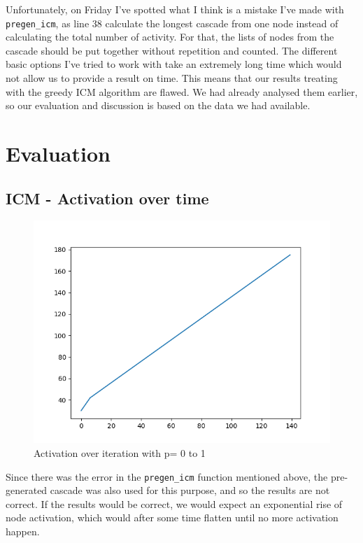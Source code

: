 Unfortunately, on Friday I've spotted what I think is a mistake I've made with \texttt{pregen\_icm}, as line 38 calculate the longest cascade from one node instead of calculating the total number of activity.
For that, the lists of nodes from the cascade should be put together without repetition and counted. The different basic options I've tried to work with take an extremely long time which would not allow us to provide a result on time. This means that our results treating with the greedy ICM algorithm are flawed. We had already analysed them earlier, so our evaluation and discussion is based on the data we had available.

\section{Evaluation}
\subsection{ICM - Activation over time}
\begin{figure}[H]
    \centering
    \includegraphics[width=0.5\linewidth]{Report/figs/ICM-0to1.png}
    \caption{Activation over iteration with p= 0 to 1}
    \label{fig:icm01}
\end{figure}
Since there was the error in the \texttt{pregen\_icm} function mentioned above, the pre-generated cascade was also used for this purpose, and so the results are not correct. If the results would be correct, we would expect an exponential rise of node activation, which would after some time flatten until no more activation happen.
